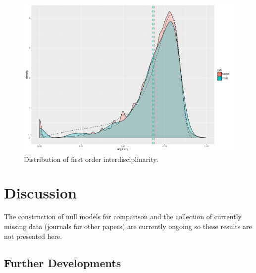 \begin{figure}
\centering
\includegraphics[width=\textwidth]{figures/firstorderint_withNull}
\caption{Distribution of first order interdisciplinarity.}
\label{fig:firstorderint}
\end{figure}












\section*{Discussion}
\label{sec:discussion}



The construction of null models for comparison and the collection of currently missing data (journals for other papers) are currently ongoing so these results are not presented here.




\subsection*{Further Developments}







